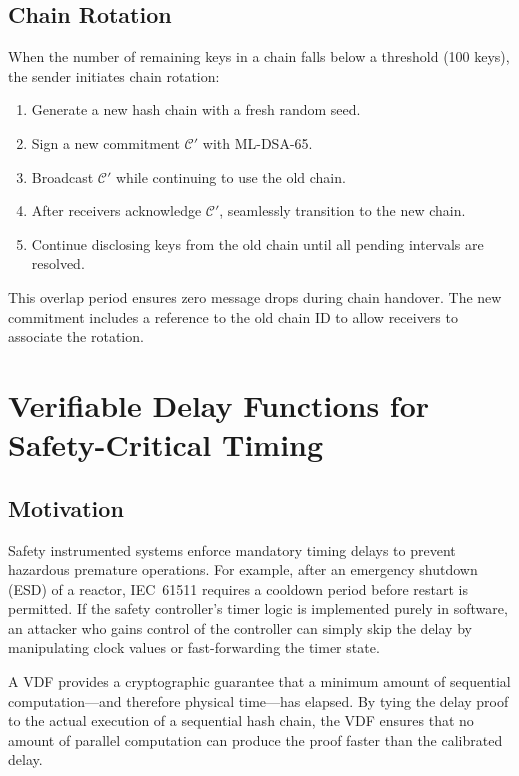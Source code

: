 \documentclass[conference,10pt]{IEEEtran}
\begin{document}
\subsection{Chain Rotation}

When the number of remaining keys in a chain falls below a threshold (100 keys), the sender initiates chain rotation:

\begin{enumerate}
  \item Generate a new hash chain with a fresh random seed.
  \item Sign a new commitment $\mathcal{C}'$ with ML-DSA-65.
  \item Broadcast $\mathcal{C}'$ while continuing to use the old chain.
  \item After receivers acknowledge $\mathcal{C}'$, seamlessly transition to the new chain.
  \item Continue disclosing keys from the old chain until all pending intervals are resolved.
\end{enumerate}

This overlap period ensures zero message drops during chain handover. The new commitment includes a reference to the old chain ID to allow receivers to associate the rotation.

\section{Verifiable Delay Functions for Safety-Critical Timing}
\label{sec:vdf}

\subsection{Motivation}

Safety instrumented systems enforce mandatory timing delays to prevent hazardous premature operations. For example, after an emergency shutdown (ESD) of a reactor, IEC~61511 requires a cooldown period before restart is permitted. If the safety controller's timer logic is implemented purely in software, an attacker who gains control of the controller can simply skip the delay by manipulating clock values or fast-forwarding the timer state.

A VDF provides a cryptographic guarantee that a minimum amount of sequential computation---and therefore physical time---has elapsed. By tying the delay proof to the actual execution of a sequential hash chain, the VDF ensures that no amount of parallel computation can produce the proof faster than the calibrated delay.
\end{document}

